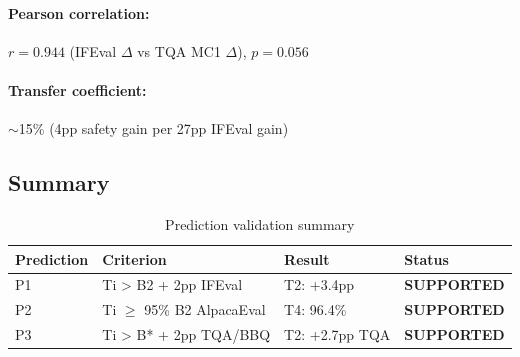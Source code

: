 \paragraph{Pearson correlation:} $r = 0.944$ (IFEval $\Delta$ vs TQA MC1 $\Delta$), $p = 0.056$

\paragraph{Transfer coefficient:} $\sim$15\% (4pp safety gain per 27pp IFEval gain)

\subsection{Summary}

\begin{table}[h]
\centering
\caption{Prediction validation summary}
\label{tab:summary}
\begin{tabular}{llll}
\toprule
Prediction & Criterion & Result & Status \\
\midrule
P1 & Ti > B2 + 2pp IFEval & T2: +3.4pp & \textbf{SUPPORTED} \\
P2 & Ti $\geq$ 95\% B2 AlpacaEval & T4: 96.4\% & \textbf{SUPPORTED} \\
P3 & Ti > B* + 2pp TQA/BBQ & T2: +2.7pp TQA & \textbf{SUPPORTED} \\
\bottomrule
\end{tabular}
\end{table}
